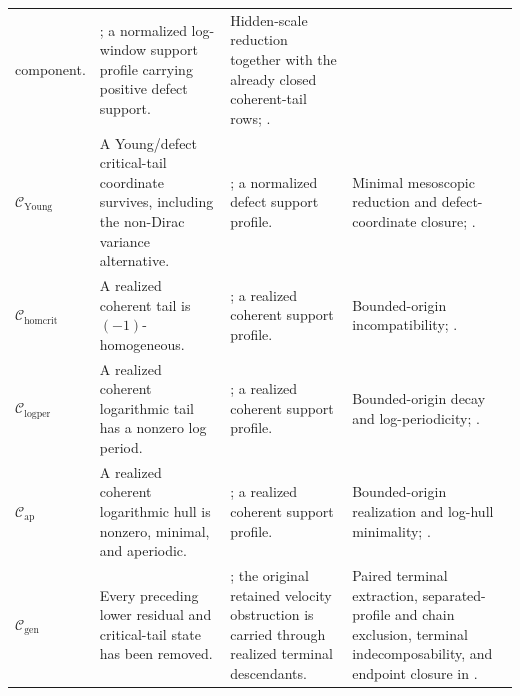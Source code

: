 \documentclass[11pt]{amsart}
\numberwithin{equation}{section}
\theoremstyle{plain}
\theoremstyle{definition}
\theoremstyle{remark}
\newcommand{\Cgen}{\mathcal C_{\mathrm{gen}}}
\newcommand{\Chomcrit}{\mathcal C_{\mathrm{homcrit}}}
\newcommand{\Clogper}{\mathcal C_{\mathrm{logper}}}
\newcommand{\Capcrit}{\mathcal C_{\mathrm{ap}}}
\newcommand{\Cyoung}{\mathcal C_{\mathrm{Young}}}
\begin{document}
\begin{longtable}{@{}L{0.13\textwidth}L{0.25\textwidth}L{0.31\textwidth}L{0.25\textwidth}@{}}
component. &
; a normalized log-window support
profile carrying positive defect support. &
Hidden-scale reduction together with the already closed coherent-tail rows;
.\\
\(\Cyoung\) &
A Young/defect critical-tail coordinate survives, including the non-Dirac
variance alternative. &
;
a normalized defect support profile. &
Minimal mesoscopic reduction and defect-coordinate closure;
.\\
\(\Chomcrit\) &
A realized coherent tail is \((-1)\)-homogeneous. &
; a realized coherent
support profile. &
Bounded-origin incompatibility;
.\\
\(\Clogper\) &
A realized coherent logarithmic tail has a nonzero log period. &
; a realized coherent
support profile. &
Bounded-origin decay and log-periodicity;
.\\
\(\Capcrit\) &
A realized coherent logarithmic hull is nonzero, minimal, and aperiodic. &
; a realized coherent
support profile. &
Bounded-origin realization and log-hull minimality;
.\\
\(\Cgen\) &
Every preceding lower residual and critical-tail state has been removed. &
; the original retained velocity
obstruction is carried through realized terminal descendants. &
Paired terminal extraction, separated-profile and chain exclusion, terminal
indecomposability, and endpoint closure in .\\
\hline
\end{longtable}
\endgroup
\end{document}
